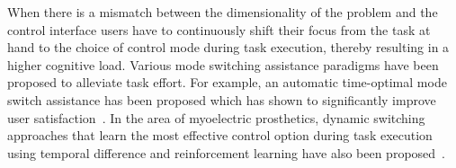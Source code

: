 \documentclass[letterpaper, 10 pt, conference]{ieeeconf}  %
\begin{document}
When there is a mismatch between the dimensionality of the problem and the control interface users have to continuously shift their focus from the task at hand to the choice of control mode during task execution, thereby resulting in a higher cognitive load. Various mode switching assistance paradigms have been proposed to alleviate task effort. For example, an automatic time-optimal mode switch assistance has been proposed which has shown to significantly improve user satisfaction~\cite{herlant2016assistive}. In the area of myoelectric prosthetics, dynamic switching approaches that learn the most effective control option during task execution using temporal difference and reinforcement learning have also been proposed~\cite{pilarski2012dynamic}. 


\end{document}
